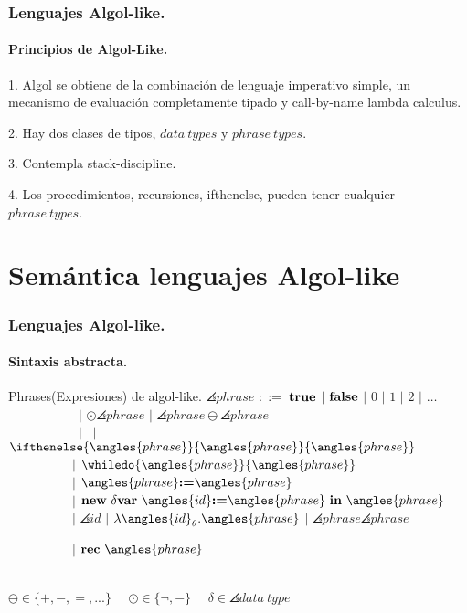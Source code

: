 \documentclass{beamer} %
\begin{document}
\begin{frame}
\frametitle{Lenguajes Algol-like.}
\framesubtitle{Principios de Algol-Like.}
\begin{block}{}
1. Algol se obtiene de la combinaci\'on de lenguaje imperativo simple, un mecanismo de evaluaci\'on completamente tipado y
call-by-name lambda calculus.\\
\end{block}
\begin{block}{}
2. Hay dos clases de tipos, $data \ types$ y $phrase \ types$.\\
\end{block}
\begin{block}{}
3. Contempla stack-discipline.\\
\end{block}
\begin{block}{}
4. Los procedimientos, recursiones, ifthenelse, pueden tener cualquier $phrase \ types$.
\end{block}
\end{frame}

\section{Sem\'antica lenguajes Algol-like}
\begin{frame}
\frametitle{Lenguajes Algol-like.}
\framesubtitle{Sintaxis abstracta.}

\begin{block}{Phrases(Expresiones) de algol-like.}
$\angles{phrase}$ $::=$ $\bf{true}$ $|$ $\bf{false}$ $|$ $0$ $|$ $1$ $|$ $2$ $|$ $\ldots$\\

\ \ \ \ \ \ \ \ \ \ \ $|$ $\odot \angles{phrase}$ $|$ $\angles{phrase} \ominus \angles{phrase}$\\

\ \ \ \ \ \ \ \ \ \ \ $|$ \cskip \ $|$ $\ifthenelse{\angles{phrase}}{\angles{phrase}}{\angles{phrase}}$\\

\ \ \ \ \ \ \ \ \ \ $|$ $\whiledo{\angles{phrase}}{\angles{phrase}}$\\

\ \ \ \ \ \ \ \ \ \ $|$ $\assig{\angles{phrase}}{\angles{phrase}}$\\

\ \ \ \ \ \ \ \ \ \ $|$ $\newdeltavar{\angles{id}}{\angles{phrase}}{\angles{phrase}}$\\

\ \ \ \ \ \ \ \ \ \ $|$ $\angles{id}$ $|$ $\clambda{\angles{id}}{\theta}{\angles{phrase}}$ $|$ $\angles{phrase}\angles{phrase}$ 

\ \ \ \ \ \ \ \ \ \ $|$ $\rec{\angles{phrase}}$\\

\

$\ominus \in \{+, -, =, ...\}$ \ \
$\odot \in \{ \neg , - \}$ \ \
$\delta \in \angles{data \ type}$
\end{block}
\end{frame}
\end{document}

